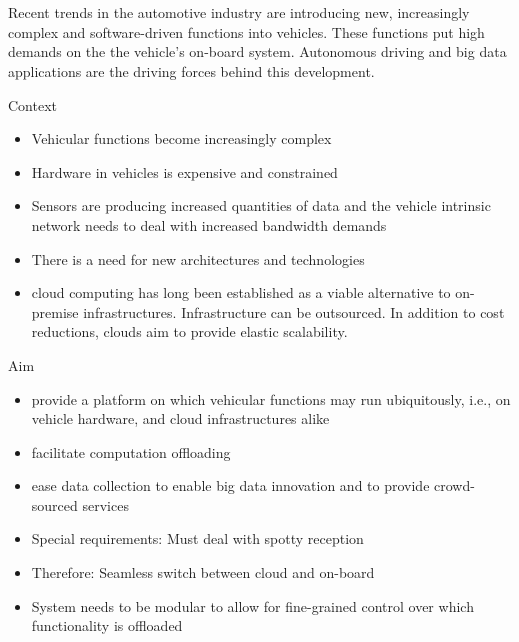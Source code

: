 \chapter{\abstractname}

Recent trends in the automotive industry are introducing new, increasingly complex and software-driven functions into vehicles. These functions put high demands on the the vehicle's on-board system. Autonomous driving and big data applications are the driving forces behind this development.

Context
\begin{itemize}
\item Vehicular functions become increasingly complex
\item Hardware in vehicles is expensive and constrained
\item Sensors are producing increased quantities of data and the vehicle intrinsic network needs to deal with increased bandwidth demands
\item There is a need for new architectures and technologies
\item cloud computing has long been established as a viable alternative to on-premise infrastructures. Infrastructure can be outsourced. In addition to cost reductions, clouds aim to provide elastic scalability.
\end{itemize}

Aim
\begin{itemize}
\item provide a platform on which vehicular functions may run ubiquitously, i.e., on vehicle hardware, and cloud infrastructures alike
\item facilitate computation offloading
\item ease data collection to enable big data innovation and to provide crowd-sourced services
\item Special requirements: Must deal with spotty reception
\item Therefore: Seamless switch between cloud and on-board
\item System needs to be modular to allow for fine-grained control over which functionality is offloaded
\end{itemize}

